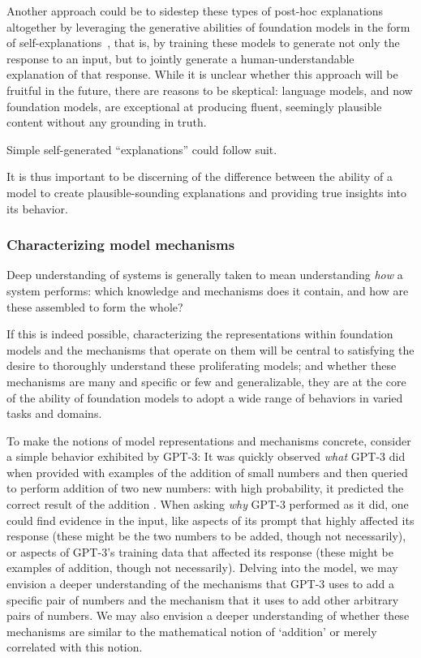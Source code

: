 Another approach could be to sidestep these types of post-hoc explanations altogether by leveraging the generative abilities of foundation models in the form of self-explanations~\citep[cf.][]{elton2020self,chen2018looks},
that is, by training these models to generate not only the response to an input, but to jointly generate a human-understandable explanation of that response. While it is unclear whether this approach will be fruitful in the future, there are reasons to be skeptical: language models, and now foundation models, are exceptional at producing fluent, seemingly plausible content without any grounding in truth.

Simple self-generated “explanations” could follow suit.

It is thus important to be discerning of the difference between the ability of a model to create plausible-sounding explanations and providing true insights into its behavior.

\subsubsection{Characterizing model mechanisms}

Deep understanding of systems is generally taken to mean understanding \textit{how} a system performs: which knowledge and mechanisms does it contain, and how are these assembled to form the whole?

If this is indeed possible, characterizing the representations within foundation models and the mechanisms that operate on them will be central to satisfying the desire to thoroughly understand these proliferating models; and whether these mechanisms are many and specific or few and generalizable, they are at the core of the ability of foundation models to adopt a wide range of behaviors in varied tasks and domains.

To make the notions of model representations and mechanisms concrete, consider a simple behavior exhibited by GPT-3: It was quickly observed \textit{what} GPT-3 did when provided with examples of the addition of small numbers and then queried to perform addition of two new numbers: with high probability, it predicted the correct result of the addition \citep{branwen2020gpt,brockman2020math}. When asking \textit{why} GPT-3 performed as it did, one could find evidence in the input, like aspects of its prompt that highly affected its response (these might be the two numbers to be added, though not necessarily), or aspects of GPT-3’s training data that affected its response (these might be examples of addition, though not necessarily). Delving into the model, we may envision a deeper understanding of the mechanisms that GPT-3 uses to add a specific pair of numbers and the mechanism that it uses to add other arbitrary pairs of numbers. We may also envision a deeper understanding of whether these mechanisms are similar to the mathematical notion of `addition' or merely correlated with this notion.

